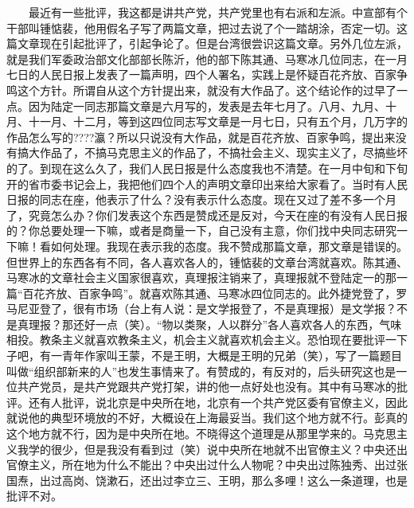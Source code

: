 \documentclass[cn,11pt,chinese]{elegantbook}
\begin{document}
　　最近有一些批评，我这都是讲共产党，共产党里也有右派和左派。中宣部有个干部叫锺惦裴，他用假名子写了两篇文章，把过去说了个一踏胡涂，否定一切。这篇文章现在引起批评了，引起争论了。但是台湾很尝识这篇文章。另外几位左派，就是我们军委政治部文化部部长陈沂，他的部下陈其通、马寒冰几位同志，在一月七日的人民日报上发表了一篇声明，四个人署名，实践上是怀疑百花齐放、百家争鸣这个方针。所谓自从这个方针提出来，就没有大作品了。这个结论作的过早了一点。因为陆定一同志那篇文章是六月写的，发表是去年七月了。八月、九月、十月、十一月、十二月，等到这四位同志写文章是一月七日，只有五个月，几万字的作品怎么写的????瀛？所以只说没有大作品，就是百花齐放、百家争鸣，提出来没有搞大作品了，不搞马克思主义的作品了，不搞社会主义、现实主义了，尽搞些坏的了。到现在这么久了，我们人民日报是什么态度我也不清楚。在一月中旬和下旬开的省市委书记会上，我把他们四个人的声明文章印出来给大家看了。当时有人民日报的同志在座，他表示了什么？没有表示什么态度。现在又过了差不多一个月了，究竟怎么办？你们发表这个东西是赞成还是反对，今天在座的有没有人民日报的？你总要处理一下嘛，或者是商量一下，自己没有主意，你们找中央同志研究一下嘛！看如何处理。我现在表示我的态度。我不赞成那篇文章，那文章是错误的。但世界上的东西各有不同，各人喜欢各人的，锺惦裴的文章台湾就喜欢。陈其通、马寒冰的文章社会主义国家很喜欢，真理报注销来了，真理报就不登陆定一的那一篇“百花齐放、百家争鸣”。就喜欢陈其通、马寒冰四位同志的。此外捷党登了，罗马尼亚登了，很有市场（台上有人说：是文学报登了，不是真理报）是文学报？不是真理报？那还好一点（笑）。“物以类聚，人以群分”各人喜欢各人的东西，气味相投。教条主义就喜欢教条主义，机会主义就喜欢机会主义。恐怕现在要批评一下子吧，有一青年作家叫王蒙，不是王明，大概是王明的兄弟（笑），写了一篇题目叫做“组织部新来的人”也发生事情来了。有赞成的，有反对的，后头研究这也是一位共产党员，是共产党跟共产党打架，讲的他一点好处也没有。其中有马寒冰的批评。还有人批评，说北京是中央所在地，北京有一个共产党区委有官僚主义，因此就说他的典型环境放的不好，大概设在上海最妥当。我们这个地方就不行。彭真的这个地方就不行，因为是中央所在地。不晓得这个道理是从那里学来的。马克思主义我学的很少，但是我没有看到过（笑）说中央所在地就不出官僚主义？中央还出官僚主义，所在地为什么不能出？中央出过什么人物呢？中央出过陈独秀、出过张国焘，出过高岗、饶漱石，还出过李立三、王明，那么多哩！这么一条道理，也是批评不对。\\
\end{document}
